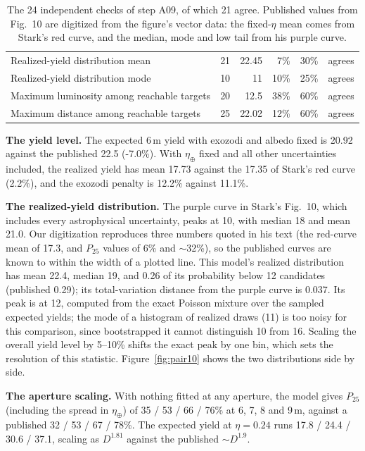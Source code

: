 \documentclass[11pt,a4paper]{article}
\begin{document}
\begin{table}[htbp]
\begin{tabular}{p{5.4cm}rrrrl}
Realized-yield distribution mean & 21 & 22.45 & 7\% & 30\% & agrees \\
Realized-yield distribution mode & 10 & 11 & 10\% & 25\% & agrees \\
Maximum luminosity among reachable targets & 20 & 12.5 & 38\% & 60\% & agrees \\
Maximum distance among reachable targets & 25 & 22.02 & 12\% & 60\% & agrees \\
\bottomrule
\end{tabular}
\caption{The 24 independent checks of step A09, of which 21 agree. Published
values from Fig.~10 are digitized from the figure's vector data: the fixed-$\eta$ mean comes from
Stark's red curve, and the median, mode and low tail from his purple curve.}
\label{tab:verif}
\end{table}

\textbf{The yield level.} The expected 6\,m yield with exozodi and albedo fixed is 20.92
against the published 22.5 (-7.0\%). With $\eta_\oplus$ fixed and all other
uncertainties included, the realized yield has mean 17.73 against the 17.35 of
Stark's red curve (2.2\%), and the exozodi penalty is 12.2\% against 11.1\%.

\textbf{The realized-yield distribution.} The purple curve in Stark's Fig.~10, which includes
every astrophysical uncertainty, peaks at 10, with median 18 and mean
21.0. Our digitization reproduces three numbers quoted in his text (the red-curve mean
of 17.3, and $P_{25}$ values of 6\% and $\sim$32\%), so the published curves are known to within
the width of a plotted line. This model's realized distribution has mean 22.4, median
19, and 0.26 of its probability below 12 candidates (published 0.29); its
total-variation distance from the purple curve is 0.037. Its peak is at 12,
computed from the exact Poisson mixture over the sampled expected yields; the mode of a histogram
of realized draws (11) is too noisy for this comparison, since bootstrapped it cannot
distinguish 10 from 16. Scaling the overall yield level by 5--10\% shifts the exact peak by one
bin, which sets the resolution of this statistic. Figure~\ref{fig:pair10} shows the two
distributions side by side.

\textbf{The aperture scaling.} With nothing fitted at any aperture, the model gives $P_{25}$
(including the spread in $\eta_\oplus$) of 35 / 53 / 66 / 76\% at 6, 7, 8 and 9\,m, against a published
32 / 53 / 67 / 78\%. The expected yield at $\eta = 0.24$ runs 17.8 / 24.4 / 30.6 / 37.1, scaling as
$D^{1.81}$ against the published $\sim D^{1.9}$.
\end{document}
